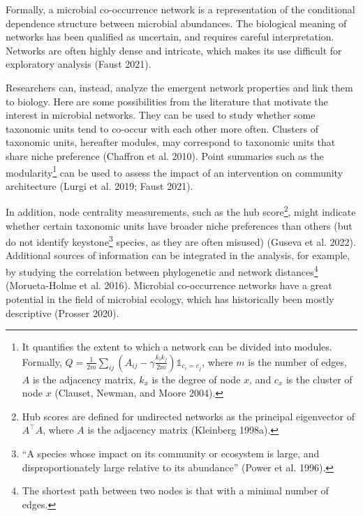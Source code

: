 \documentclass[
  a4paper,
]{article}
\begin{document}
Formally, a microbial co-occurrence network is a representation of the
conditional dependence structure between microbial abundances. The
biological meaning of networks has been qualified as uncertain, and
requires careful interpretation. Networks are often highly dense and
intricate, which makes its use difficult for exploratory analysis (Faust
2021).

Researchers can, instead, analyze the emergent network properties and
link them to biology. Here are some possibilities from the literature
that motivate the interest in microbial networks. They can be used to
study whether some taxonomic units tend to co-occur with each other more
often. Clusters of taxonomic units, hereafter modules, may correspond to
taxonomic units that share niche preference (Chaffron et al. 2010).
Point summaries such as the modularity\footnote{It quantifies the extent
  to which a network can be divided into modules. Formally,
  \(Q = \frac{1}{2m}\sum_{ij}\left( A_{ij} - \gamma \frac{k_ik_j}{2m}\right )\mathbb1_{c_i = c_j}\),
  where \(m\) is the number of edges, \(A\) is the adjacency matrix,
  \(k_x\) is the degree of node \(x\), and \(c_x\) is the cluster of
  node \(x\) (Clauset, Newman, and Moore 2004).} can be used to assess
the impact of an intervention on community architecture (Lurgi et al.
2019; Faust 2021).

In addition, node centrality measurements, such as the hub
score\footnote{Hub scores are defined for undirected networks as the
  principal eigenvector of \(A^\top A\), where \(A\) is the adjacency
  matrix (Kleinberg 1998a).}, might indicate whether certain taxonomic
units have broader niche preferences than others (but do not identify
keystone\footnote{``A species whose impact on its community or ecosystem
  is large, and disproportionately large relative to its abundance''
  (Power et al. 1996).} species, as they are often misused) (Guseva et
al. 2022). Additional sources of information can be integrated in the
analysis, for example, by studying the correlation between phylogenetic
and network distances\footnote{The shortest path between two nodes is
  that with a minimal number of edges.} (Morueta-Holme et al. 2016).
Microbial co-occurrence networks have a great potential in the field of
microbial ecology, which has historically been mostly descriptive
(Prosser 2020).
\end{document}
